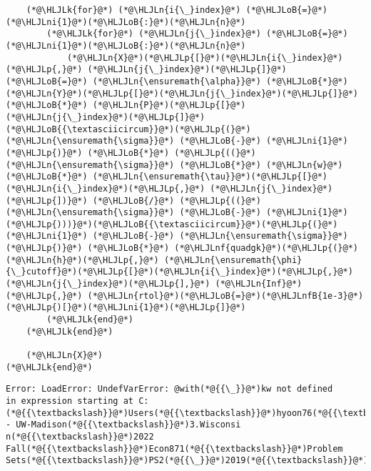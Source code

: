 \documentclass[12pt,a4paper]{article}
\newcommand{\HLJLk}[1]{\textcolor[RGB]{148,91,176}{\textbf{#1}}}
\newcommand{\HLJLn}[1]{#1}
\newcommand{\HLJLnf}[1]{\textcolor[RGB]{66,102,213}{#1}}
\newcommand{\HLJLnfB}[1]{\textcolor[RGB]{59,151,46}{#1}}
\newcommand{\HLJLni}[1]{\textcolor[RGB]{59,151,46}{#1}}
\newcommand{\HLJLoB}[1]{\textcolor[RGB]{102,102,102}{\textbf{#1}}}
\newcommand{\HLJLp}[1]{#1}
\begin{document}
\begin{lstlisting}
    (*@\HLJLk{for}@*) (*@\HLJLn{i{\_}index}@*) (*@\HLJLoB{=}@*) (*@\HLJLni{1}@*)(*@\HLJLoB{:}@*)(*@\HLJLn{n}@*)
        (*@\HLJLk{for}@*) (*@\HLJLn{j{\_}index}@*) (*@\HLJLoB{=}@*) (*@\HLJLni{1}@*)(*@\HLJLoB{:}@*)(*@\HLJLn{n}@*)
            (*@\HLJLn{X}@*)(*@\HLJLp{[}@*)(*@\HLJLn{i{\_}index}@*)(*@\HLJLp{,}@*) (*@\HLJLn{j{\_}index}@*)(*@\HLJLp{]}@*) (*@\HLJLoB{=}@*) (*@\HLJLn{\ensuremath{\alpha}}@*) (*@\HLJLoB{*}@*) (*@\HLJLn{Y}@*)(*@\HLJLp{[}@*)(*@\HLJLn{j{\_}index}@*)(*@\HLJLp{]}@*) (*@\HLJLoB{*}@*) (*@\HLJLn{P}@*)(*@\HLJLp{[}@*)(*@\HLJLn{j{\_}index}@*)(*@\HLJLp{]}@*)(*@\HLJLoB{{\textasciicircum}}@*)(*@\HLJLp{(}@*)(*@\HLJLn{\ensuremath{\sigma}}@*) (*@\HLJLoB{-}@*) (*@\HLJLni{1}@*)(*@\HLJLp{)}@*) (*@\HLJLoB{*}@*) (*@\HLJLp{((}@*)(*@\HLJLn{\ensuremath{\sigma}}@*) (*@\HLJLoB{*}@*) (*@\HLJLn{w}@*) (*@\HLJLoB{*}@*) (*@\HLJLn{\ensuremath{\tau}}@*)(*@\HLJLp{[}@*)(*@\HLJLn{i{\_}index}@*)(*@\HLJLp{,}@*) (*@\HLJLn{j{\_}index}@*)(*@\HLJLp{])}@*) (*@\HLJLoB{/}@*) (*@\HLJLp{((}@*)(*@\HLJLn{\ensuremath{\sigma}}@*) (*@\HLJLoB{-}@*) (*@\HLJLni{1}@*)(*@\HLJLp{)))}@*)(*@\HLJLoB{{\textasciicircum}}@*)(*@\HLJLp{(}@*)(*@\HLJLni{1}@*) (*@\HLJLoB{-}@*) (*@\HLJLn{\ensuremath{\sigma}}@*)(*@\HLJLp{)}@*) (*@\HLJLoB{*}@*) (*@\HLJLnf{quadgk}@*)(*@\HLJLp{(}@*)(*@\HLJLn{h}@*)(*@\HLJLp{,}@*) (*@\HLJLn{\ensuremath{\phi}{\_}cutoff}@*)(*@\HLJLp{[}@*)(*@\HLJLn{i{\_}index}@*)(*@\HLJLp{,}@*) (*@\HLJLn{j{\_}index}@*)(*@\HLJLp{],}@*) (*@\HLJLn{Inf}@*)(*@\HLJLp{,}@*) (*@\HLJLn{rtol}@*)(*@\HLJLoB{=}@*)(*@\HLJLnfB{1e-3}@*)(*@\HLJLp{)[}@*)(*@\HLJLni{1}@*)(*@\HLJLp{]}@*)
        (*@\HLJLk{end}@*)
    (*@\HLJLk{end}@*)

    (*@\HLJLn{X}@*)
(*@\HLJLk{end}@*)
\end{lstlisting}

\begin{lstlisting}
Error: LoadError: UndefVarError: @with(*@{{\_}}@*)kw not defined
in expression starting at C:(*@{{\textbackslash}}@*)Users(*@{{\textbackslash}}@*)hyoon76(*@{{\textbackslash}}@*)OneDrive - UW-Madison(*@{{\textbackslash}}@*)3.Wisconsi
n(*@{{\textbackslash}}@*)2022 Fall(*@{{\textbackslash}}@*)Econ871(*@{{\textbackslash}}@*)Problem Sets(*@{{\textbackslash}}@*)PS2(*@{{\_}}@*)2019(*@{{\textbackslash}}@*)ps2(*@{{\_}}@*)2019(*@{{\_}}@*)model(*@{{\_}}@*)hj.jl:9
\end{lstlisting}
\end{document}
